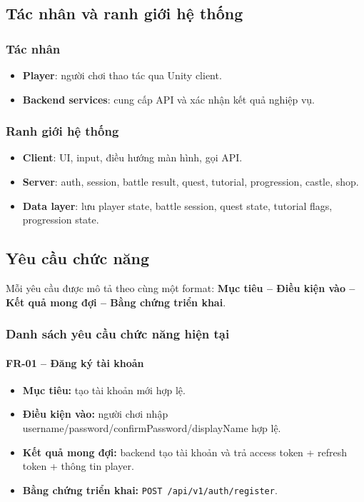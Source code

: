 \subsection{Tác nhân và ranh giới hệ thống}
\label{subsec:req-actors}

\subsubsection{Tác nhân}
\begin{itemize}
    \item \textbf{Player}: người chơi thao tác qua Unity client.
    \item \textbf{Backend services}: cung cấp API và xác nhận kết quả nghiệp vụ.
\end{itemize}

\subsubsection{Ranh giới hệ thống}
\begin{itemize}
    \item \textbf{Client}: UI, input, điều hướng màn hình, gọi API.
    \item \textbf{Server}: auth, session, battle result, quest, tutorial, progression, castle, shop.
    \item \textbf{Data layer}: lưu player state, battle session, quest state, tutorial flags, progression state.
\end{itemize}

\subsection{Yêu cầu chức năng}
\label{subsec:req-functional}

Mỗi yêu cầu được mô tả theo cùng một format: \textbf{Mục tiêu -- Điều kiện vào -- Kết quả mong đợi -- Bằng chứng triển khai}.

\subsubsection{Danh sách yêu cầu chức năng hiện tại}

\paragraph{FR-01 -- Đăng ký tài khoản}
\begin{itemize}
    \item \textbf{Mục tiêu:} tạo tài khoản mới hợp lệ.
    \item \textbf{Điều kiện vào:} người chơi nhập username/password/confirmPassword/displayName hợp lệ.
    \item \textbf{Kết quả mong đợi:} backend tạo tài khoản và trả access token + refresh token + thông tin player.
    \item \textbf{Bằng chứng triển khai:} \texttt{POST /api/\allowbreak v1/\allowbreak auth/\allowbreak register}.
\end{itemize}

